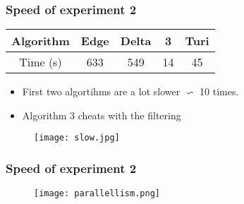 \begin{frame}
\frametitle{Speed of experiment 2}
\begin{table}
\centering
\begin{tabular}{|c|c|c|c|c|}
\hline
Algorithm & Edge & Delta & 3 & Turi\\
\hline
Time (s) & 633 & 549 & 14 & 45\\
\hline
\end{tabular}
\end{table}

\begin{itemize}
\item First two algortihms are a lot slower $\backsim$ 10 times.
\item Algorithm 3 cheats with the filtering
\end{itemize}

\end{frame}

\begin{frame}

\begin{figure}

	\texttt{[image: slow.jpg]}

\end{figure}
\end{frame}


\begin{frame}
\frametitle{Speed of experiment 2}
\begin{figure}

	\texttt{[image: parallellism.png]}

\end{figure}
\end{frame}

